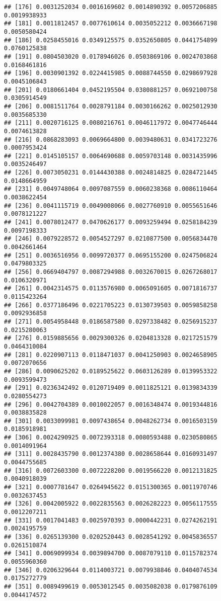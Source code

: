 \documentclass[
]{article}
\begin{document}
\begin{verbatim}
## [176] 0.0031252034 0.0016169602 0.0014890392 0.0057206885 0.0019938933
## [181] 0.0011812457 0.0077610614 0.0035052212 0.0036667198 0.0050580424
## [186] 0.0258455016 0.0349125575 0.0352650805 0.0441754899 0.0760125838
## [191] 0.0804503020 0.0178946026 0.0503869106 0.0024703868 0.0168461816
## [196] 0.0030901392 0.0224415985 0.0088744550 0.0298697928 0.0045106843
## [201] 0.0180661404 0.0452195504 0.0380881257 0.0692100758 0.0305914549
## [206] 0.0081511764 0.0028791184 0.0030166262 0.0025012930 0.0035685330
## [211] 0.0020716125 0.0080216761 0.0046117972 0.0047746444 0.0074613828
## [216] 0.0868283093 0.0069664800 0.0039480631 0.0341723276 0.0007953424
## [221] 0.0145105157 0.0064690688 0.0059703148 0.0031435996 0.0035246497
## [226] 0.0073050231 0.0144430388 0.0024814825 0.0284721445 0.0148664959
## [231] 0.0049748064 0.0097087559 0.0060238368 0.0086110464 0.0038622454
## [236] 0.0041115719 0.0049008066 0.0027760910 0.0055651646 0.0078121227
## [241] 0.0078012477 0.0470626177 0.0093259494 0.0258184239 0.0097198333
## [246] 0.0079228572 0.0054527297 0.0210877500 0.0056834470 0.0042661464
## [251] 0.0036516956 0.0099720377 0.0695155200 0.0247506824 0.0479803325
## [256] 0.0669404797 0.0087294988 0.0032670015 0.0267268017 0.0106320971
## [261] 0.0042314575 0.0113576980 0.0065091605 0.0071816737 0.0115423264
## [266] 0.0377186496 0.0221705223 0.0130739503 0.0059858258 0.0092936858
## [271] 0.0054958448 0.0186587580 0.0297338482 0.0256915237 0.0215280063
## [276] 0.0159885656 0.0029300326 0.0204813328 0.0217251579 0.0464310084
## [281] 0.0220907113 0.0118471037 0.0041250903 0.0024658905 0.0072070656
## [286] 0.0090625202 0.0189525622 0.0603126289 0.0139953322 0.0093599473
## [291] 0.0236342492 0.0120719409 0.0011825121 0.0139834339 0.0280554273
## [296] 0.0042704389 0.0010022057 0.0016348474 0.0019344816 0.0038835828
## [301] 0.0033099981 0.0097438654 0.0048262734 0.0016503159 0.0185918981
## [306] 0.0024290925 0.0072393318 0.0080593488 0.0230580865 0.0014091964
## [311] 0.0028435790 0.0012374380 0.0028658644 0.0160931497 0.0044755685
## [316] 0.0072603300 0.0072228200 0.0019566220 0.0012131825 0.0040918039
## [321] 0.0007781647 0.0264945622 0.0151300365 0.0011970746 0.0032637453
## [326] 0.0042005922 0.0022835563 0.0026282223 0.0056117555 0.0012207211
## [331] 0.0017041483 0.0025970393 0.0000442231 0.0274262191 0.0024195759
## [336] 0.0265139300 0.0202520443 0.0028541292 0.0045836557 0.0261510874
## [341] 0.0069099934 0.0039894700 0.0087079110 0.0115782374 0.0055960360
## [346] 0.0206329644 0.0114003721 0.0079938846 0.0404074534 0.0175272779
## [351] 0.0089499619 0.0053012545 0.0035082038 0.0179876109 0.0044174572

\end{verbatim}
\end{document}

